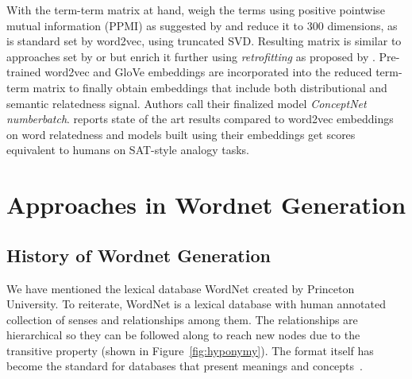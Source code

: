 With the term-term matrix at hand, \citeauthor{speer_conceptnet_2017} weigh the terms using positive pointwise mutual information (PPMI) as suggested by \textcite{levy_improving_2015} and reduce it to 300 dimensions, as is standard set by word2vec, using truncated SVD\@.
Resulting matrix is similar to approaches set by \textcite{deerwester_indexing_1990} or \textcite{pennington_glove_2014} but \citeauthor{speer_conceptnet_2017} enrich it further using \emph{retrofitting} as proposed by \textcite{faruqui_improving_2014}.
Pre-trained word2vec and GloVe embeddings are incorporated into the reduced term-term matrix to finally obtain embeddings that include both distributional and semantic relatedness signal.
Authors call their finalized model \emph{ConceptNet numberbatch}.
\citeauthor{speer_conceptnet_2017} reports state of the art results compared to word2vec embeddings on word relatedness and models built using their embeddings get scores equivalent to humans on SAT-style analogy tasks.



\section{Approaches in Wordnet Generation}%
\label{sec:approaches_in_wordnet_generation}

\subsection{History of Wordnet Generation}%
\label{sub:history_of_wordnet_generation}

We have mentioned the lexical database WordNet created by Princeton University.
To reiterate, WordNet is a lexical database with human annotated collection of senses and relationships among them.
The relationships are hierarchical so they can be followed along to reach new nodes due to the transitive property (shown in Figure~\ref{fig:hyponymy}).
The format itself has become the standard for databases that present meanings and concepts~\cite{neale_survey_2018}.

